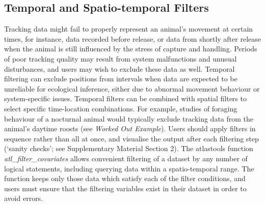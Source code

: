     \subsection*{Temporal and Spatio-temporal Filters}

    Tracking data might fail to properly represent an animal's movement at certain times, for instance, data recorded before release, or data from shortly after release when the animal is still influenced by the stress of capture and handling.
    Periods of poor tracking quality may result from system malfunctions and unusual disturbances, and users may wish to exclude these data as well.
    Temporal filtering can exclude positions from intervals when data are expected to be unreliable for ecological inference, either due to abnormal movement behaviour or system-specific issues.  
    Temporal filters can be combined with spatial filters to select specific time-location combinations. 
    For example, studies of foraging behaviour of a nocturnal animal would typically exclude tracking data from the animal's daytime roosts (see \textit{Worked Out Example}).
    Users should apply filters in sequence rather than all at once, and visualise the output after each filtering step (`sanity checks'; see Supplementary Material Section 2).
    The atlastools function \textit{atl\_filter\_covariates} allows convenient filtering of a dataset by any number of logical statements, including querying data within a spatio-temporal range.
    The function keeps only those data which satisfy each of the filter conditions, and users must ensure that the filtering variables exist in their dataset in order to avoid errors.


